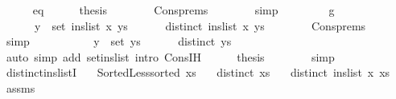 \begin{isabellebody}
\ \ \ \ \isamarkupfalse%
\ eq\isanewline
\ \ \ \ \isamarkupfalse%
\ {\isacharquery}{\kern0pt}thesis\isanewline
\ \ \ \ \ \ \isamarkupfalse%
\ Cons{\isachardot}{\kern0pt}prems\isanewline
\ \ \ \ \ \ \isamarkupfalse%
\ simp\isanewline
\ \ \isamarkupfalse%
\isanewline
\ \ \ \ \isamarkupfalse%
\ g\isanewline
\ \ \ \ \isamarkupfalse%
\isanewline
\ \ \ \ \ \ {\isachardoublequoteopen}y\ {\isasymnotin}\ set\ {\isacharparenleft}{\kern0pt}ins{\isacharunderscore}{\kern0pt}list\ x\ ys{\isacharparenright}{\kern0pt}{\isachardoublequoteclose}\isanewline
\ \ \ \ \ \ {\isachardoublequoteopen}distinct\ {\isacharparenleft}{\kern0pt}ins{\isacharunderscore}{\kern0pt}list\ x\ ys{\isacharparenright}{\kern0pt}{\isachardoublequoteclose}\isanewline
\ \ \ \ \ \ \isamarkupfalse%
\ Cons{\isachardot}{\kern0pt}prems\isanewline
\ \ \ \ \ \ \isamarkupfalse%
\ simp{\isacharplus}{\kern0pt}\isanewline
\ \ \ \ \isamarkupfalse%
\isanewline
\ \ \ \ \ \ {\isachardoublequoteopen}y\ {\isasymnotin}\ set\ ys{\isachardoublequoteclose}\isanewline
\ \ \ \ \ \ {\isachardoublequoteopen}distinct\ ys{\isachardoublequoteclose}\isanewline
\ \ \ \ \ \ \isamarkupfalse%
\ {\isacharparenleft}{\kern0pt}auto\ simp\ add{\isacharcolon}{\kern0pt}\ set{\isacharunderscore}{\kern0pt}ins{\isacharunderscore}{\kern0pt}list\ intro{\isacharcolon}{\kern0pt}\ Cons{\isachardot}{\kern0pt}IH{\isacharparenright}{\kern0pt}\isanewline
\ \ \ \ \isamarkupfalse%
\ {\isacharquery}{\kern0pt}thesis\isanewline
\ \ \ \ \ \ \isamarkupfalse%
\ simp\isanewline
\ \ \isamarkupfalse%
\isanewline
{}\isamarkupfalse%
%
\endisatagproof
{\isafoldproof}%
%
\isadelimproof
\isanewline
%
\endisadelimproof
\isanewline
{}\isamarkupfalse%
\ distinct{\isacharunderscore}{\kern0pt}ins{\isacharunderscore}{\kern0pt}listI{\isacharcolon}{\kern0pt}\isanewline
\ \ \ {\isachardoublequoteopen}Sorted{\isacharunderscore}{\kern0pt}Less{\isachardot}{\kern0pt}sorted\ xs{\isachardoublequoteclose}\isanewline
\ \ \ {\isachardoublequoteopen}distinct\ xs{\isachardoublequoteclose}\isanewline
\ \ \ {\isachardoublequoteopen}distinct\ {\isacharparenleft}{\kern0pt}ins{\isacharunderscore}{\kern0pt}list\ x\ xs{\isacharparenright}{\kern0pt}{\isachardoublequoteclose}\isanewline
%
\isadelimproof
\ \ %
\endisadelimproof
%
\isatagproof
{}\isamarkupfalse%
\ assms\isanewline

\end{isabellebody}
